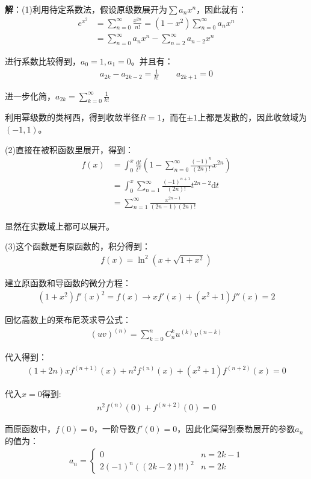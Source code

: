 \documentclass{ctexart}
\let\oldtextbf\textbf
\renewcommand{\textbf}[1]{\textcolor{brown!50!red}{\oldtextbf{#1}}}
\begin{document}
\textbf{\color{brown!50!red}解}：(1)利用待定系数法，假设原级数展开为$\sum a_nx^n$，因此就有：
\begin{align*}
  e^{x^2}&=\sum_{n=0}^\infty\frac{x^{2n}}{n!}=(1-x^2)\sum_{n=0}^\infty
a_nx^n\\
&=\sum_{n=0}^\infty a_nx^{n}-\sum_{n=2}^\infty a_{n-2}x^n
\end{align*}

进行系数比较得到，$a_0=1,a_1=0$。并且有：
\begin{align*}
    a_{2k}-a_{2k-2}=\frac{1}{k!}\qquad a_{2k+1}=0
\end{align*}

进一步化简，$a_{2k}=\sum_{k=0}^\infty \frac{1}{k!}$


利用幂级数的类柯西，得到收敛半径$R=1$，而在$\pm 1$上都是发散的，因此收敛域为$(-1,1)$。

(2)直接在被积函数里展开，得到：
\begin{align*}
  f(x)&=\int_0^x\frac{\mathrm{d}t }{t^2}\left(1-\sum_{n=0}^\infty\frac{(-1)^n}{(2n)!}x^{2n} \right) 
\\&=\int_0^x\sum_{n=1}^\infty \frac{(-1)^{n+1}}{(2n)!}t^{2n-2}\mathrm{d}t\\
&=\sum_{n=1}^\infty \frac{x^{2n-1}}{(2n-1)(2n)!}   
\end{align*}

显然在实数域上都可以展开。

(3)这个函数是有原函数的，积分得到：
\begin{align*}
    f(x)=\ln^2(x+\sqrt{1+x^2})
\end{align*}

建立原函数和导函数的微分方程：
\begin{align*}
    (1+x^2)f'(x)^2=f(x)\to xf'(x)+(x^2+1)f''(x)=2
\end{align*}

回忆高数上的莱布尼茨求导公式：
\begin{align*}
    (uv)^{(n)}=\sum_{k=0}^nC_n^k u^{(k)}v^{(n-k)}
\end{align*}

代入得到：
\begin{align*}
    (1+2n)x f^{(n+1)}(x) + n^2 f^{(n)}(x) + (x^2 + 1) f^{(n+2)}(x) = 0
\end{align*}

代入$x=0$得到:
\begin{align*}
    n^2f^{(n)}(0)+f^{(n+2)}(0)=0
\end{align*}

而原函数中，$f(0)=0$，一阶导数$f'(0)=0$，因此化简得到泰勒展开的参数$a_n$的值为：
\begin{align*}
  a_n=\begin{cases}
0 &n=2k-1\\
2(-1)^n((2k-2)!!)^2 &n=2k
\end{cases}
\end{align*}
\end{document}
